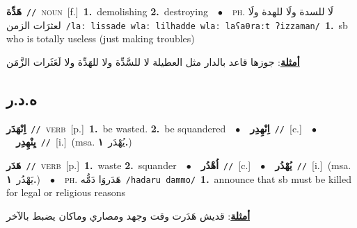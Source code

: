 \documentclass[10pt,a4paper,twoside]{article} %
\begin{document}
\begin{multicols}{2}
{\setlength\topsep{0pt}\textbf{\foreignlanguage{arabic}{هَدِّة}}\ {\color{gray}\texttt{//}\color{black}}\ \textsc{noun}\ [f.]\ \textbf{1.}~demolishing  \textbf{2.}~destroying\ \ $\bullet$\ \ \textsc{ph.} \color{gray} \foreignlanguage{arabic}{لَا للسدة ولَا للهدة ولَا لعثرَات الزمن}\color{black}\ {\color{gray}\texttt{/{\sffamily laː lissade wlaː lilhadde wlaː laʕaθraːt ʔizzaman}/}\color{black}}\ \textbf{1.}~sb who is totally useless (just making troubles)\  \begin{flushright}\color{gray}\foreignlanguage{arabic}{\textbf{\underline{\foreignlanguage{arabic}{أمثلة}}}: جوزها قاعد بالدار مثل العطيلة لا للسَّدِّة ولا للهَدِّة ولا لَعَثَرات الزَّمَن}\end{flushright}\color{black}} \vspace{2mm}

\vspace{-3mm}
\subsection*{\color{blue}\foreignlanguage{arabic}{ه.د.ر}\color{blue}{}} 

{\setlength\topsep{0pt}\textbf{\foreignlanguage{arabic}{اِنْهَدَر}}\ {\color{gray}\texttt{//}\color{black}}\ \textsc{verb}\ [p.]\ \textbf{1.}~be wasted.  \textbf{2.}~be squandered\ \ $\bullet$\ \ \setlength\topsep{0pt}\textbf{\foreignlanguage{arabic}{اِنْهِدِر}}\ {\color{gray}\texttt{//}\color{black}}\ [c.]\ \ $\bullet$\ \ \setlength\topsep{0pt}\textbf{\foreignlanguage{arabic}{يِنْهِدِر}}\ {\color{gray}\texttt{//}\color{black}}\ [i.]\ \color{gray}(msa. \foreignlanguage{arabic}{يُهْدَر}~\foreignlanguage{arabic}{\textbf{١.}})\color{black}\ } \vspace{2mm}

{\setlength\topsep{0pt}\textbf{\foreignlanguage{arabic}{هَدَر}}\ {\color{gray}\texttt{//}\color{black}}\ \textsc{verb}\ [p.]\ \textbf{1.}~waste  \textbf{2.}~squander\ \ $\bullet$\ \ \setlength\topsep{0pt}\textbf{\foreignlanguage{arabic}{اُهْدُر}}\ {\color{gray}\texttt{//}\color{black}}\ [c.]\ \ $\bullet$\ \ \setlength\topsep{0pt}\textbf{\foreignlanguage{arabic}{يُهْدُر}}\ {\color{gray}\texttt{//}\color{black}}\ [i.]\ \color{gray}(msa. \foreignlanguage{arabic}{يَهْدُر}~\foreignlanguage{arabic}{\textbf{١.}})\color{black}\ \ $\bullet$\ \ \textsc{ph.} \color{gray} \foreignlanguage{arabic}{هَدَروَا دَمُّه}\color{black}\ {\color{gray}\texttt{/{\sffamily hadaru dammo}/}\color{black}}\ \textbf{1.}~announce that sb must be killed for legal or religious reasons\  \begin{flushright}\color{gray}\foreignlanguage{arabic}{\textbf{\underline{\foreignlanguage{arabic}{أمثلة}}}: قديش هَدَرت وقت وجهد ومصاري وماكان يضبط بالآخر}\end{flushright}\color{black}} \vspace{2mm}


\end{multicols}
\end{document}
